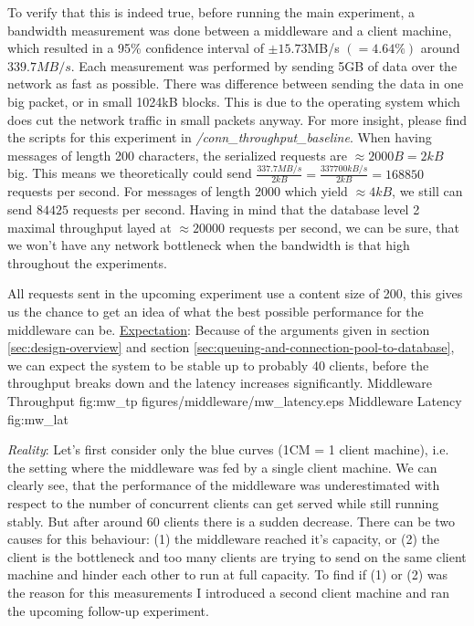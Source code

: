 \documentclass[11pt]{article}
\begin{document}
To verify that this is indeed true, before running the main experiment, a bandwidth measurement was done between a middleware and a client machine, which resulted in a 95\% confidence interval of $\pm15.73$MB/s $(=4.64\%)$ around $339.7MB/s$. Each measurement was performed by sending 5GB of data over the network as fast as possible. There was difference between sending the data in one big packet, or in small 1024kB blocks. This is due to the operating system which does cut the network traffic in small packets anyway. For more insight, please find the scripts for this experiment in \textit{/conn\_throughput\_baseline}. When having messages of length 200 characters, the serialized requests are $\approx2000B=2kB$ big. This means we theoretically could send $\frac{337.7MB/s}{2kB}=\frac{337700kB/s}{2kB}=168850$ requests per second. For messages of length 2000 which yield $\approx4kB$, we still can send $84425$ requests per second. Having in mind that the database level 2 maximal throughput layed at $\approx20000$ requests per second, we can be sure, that we won't have any network bottleneck when the bandwidth is that high throughout the experiments.

All requests sent in the upcoming experiment use a content size of 200, this gives us the chance to get an idea of what the best possible performance for the middleware can be.
\newline\underline{Expectation}: Because of the arguments given in section \ref{sec:design-overview} and section \ref{sec:queuing-and-connection-pool-to-database}, we can expect the system to be stable up to probably 40 clients, before the throughput breaks down and the latency increases significantly.
 {Middleware Throughput} {fig:mw_tp}
{figures/middleware/mw_latency.eps} {Middleware Latency} {fig:mw_lat}

\newline\textit{Reality}: Let's first consider only the blue curves (1CM = 1 client machine), i.e. the setting where the middleware was fed by a single client machine. We can clearly see, that the performance of the middleware was underestimated with respect to the number of concurrent clients can get served while still running stably. But after around 60 clients there is a sudden decrease. There can be two causes for this behaviour: (1) the middleware reached it's capacity, or (2) the client is the bottleneck and too many clients are trying to send on the same client machine and hinder each other to run at full capacity. To find if (1) or (2) was the reason for this measurements I introduced a second client machine and ran the upcoming follow-up experiment.
\end{document}
